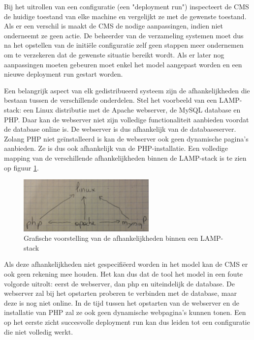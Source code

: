 Bij het uitrollen van een configuratie (een "deployment run") inspecteert de CMS de huidige toestand van elke machine en vergelijkt ze met de gewenste toestand.
Als er een verschil is maakt de CMS de nodige aanpassingen, indien niet onderneemt ze geen actie.
De beheerder van de verzameling systemen moet dus na het opstellen van de initi\"ele configuratie zelf geen stappen meer ondernemen om te verzekeren dat de gewenste situatie bereikt wordt.
Als er later nog aanpassingen moeten gebeuren moet enkel het model aangepast worden en een nieuwe deployment run gestart worden.

Een belangrijk aspect van elk gedistribueerd systeem zijn de afhankelijkheden die bestaan tussen de verschillende onderdelen.
Stel het voorbeeld van een LAMP-stack: een Linux distributie met de Apache webserver, de MySQL database en PHP.
Daar kan de webserver niet zijn volledige functionaliteit aanbieden voordat de database online is.
De webserver is dus afhankelijk van de databaseserver.
Zolang PHP niet ge\"installeerd is kan de webserver ook geen dynamische pagina's aanbieden.
Ze is dus ook afhankelijk van de PHP-installatie.
Een volledige mapping van de verschillende afhankelijkheden binnen de LAMP-stack is te zien op figuur \ref{fig:lamp_dep}.
\begin{figure}[h]
    \begin{center}
    \includegraphics[width=0.6\textwidth]{images/lamp_dep.png}
    \caption{Grafische voorstelling van de afhankelijkheden binnen een LAMP-stack}
    \label{fig:lamp_dep}
    \end{center}
\end{figure}
Als deze afhankelijkheden niet gespecifi\"eerd worden in het model kan de CMS er ook geen rekening mee houden.
Het kan dus dat de tool het model in een foute volgorde uitrolt: eerst de webserver, dan php en uiteindelijk de database.
De webserver zal bij het opstarten proberen te verbinden met de database, maar deze is nog niet online.
In de tijd tussen het opstarten van de webserver en de installatie van PHP zal ze ook geen dynamische webpagina's kunnen tonen.
Een op het eerste zicht succesvolle deployment run kan dus leiden tot een configuratie die niet volledig werkt.

